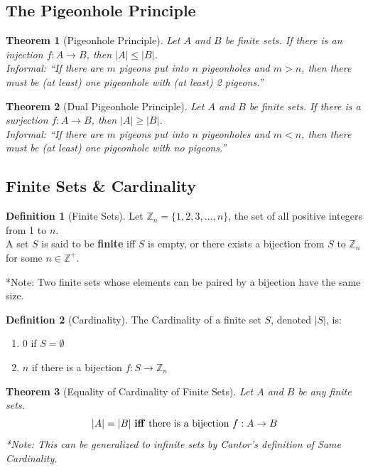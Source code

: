 \documentclass{article}
\theoremstyle{plain}
\newtheorem{theorem}{Theorem}[section]
\theoremstyle{definition}
\newtheorem*{definition}{Definition}
\theoremstyle{remark}
\begin{document}
\subsection{The Pigeonhole Principle}

\begin{theorem}[Pigeonhole Principle]
    Let $A$ and $B$ be finite sets. If there is an injection $f: A \rightarrow B$, then $|A| \leq |B|$. \\
    \textit{Informal:} ``If there are $m$ pigeons put into $n$ pigeonholes and $m > n$, then there must be (at least) one pigeonhole with (at least) 2 pigeons.''
\end{theorem}

\begin{theorem}[Dual Pigeonhole Principle]
    Let $A$ and $B$ be finite sets. If there is a surjection $f: A \rightarrow B$, then $|A| \geq |B|$. \\
    \textit{Informal:} ``If there are $m$ pigeons put into $n$ pigeonholes and $m < n$, then there must be (at least) one pigeonhole with no pigeons.''
\end{theorem}

\subsection{Finite Sets \& Cardinality}

\begin{definition}[Finite Sets]
    Let $\mathbb{Z}_n = \{1, 2, 3, \dots, n\}$, the set of all positive integers from 1 to $n$. \\
    A set $S$ is said to be \textbf{finite} iff $S$ is empty, or there exists a bijection from $S$ to $\mathbb{Z}_n$ for some $n \in \mathbb{Z}^+$.
\end{definition}
*Note: Two finite sets whose elements can be paired by a bijection have the same size.

\begin{definition}[Cardinality]
    The Cardinality of a finite set $S$, denoted $|S|$, is:
    \begin{enumerate}[label=(\roman*)]
        \item 0 if $S = \emptyset$
        \item $n$ if there is a bijection $f: S \rightarrow \mathbb{Z}_n$
    \end{enumerate}
\end{definition}

\begin{theorem}[Equality of Cardinality of Finite Sets]
    Let $A$ and $B$ be any finite sets.
    \[ |A| = |B| \text{ \textbf{iff} there is a bijection } f: A \rightarrow B \]
    *Note: This can be generalized to infinite sets by Cantor's definition of Same Cardinality.
\end{theorem}
\end{document}
